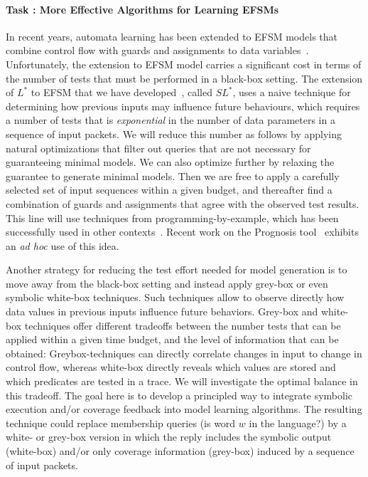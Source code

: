 \documentclass[11pt]{article}
\newcommand{\system}[1]{\mbox{\textsf{#1}}}
\newcounter{Task}
\newcommand{\task}[1]{\addtocounter{Task}{1}\paragraph{Task \theTask: #1}}
\newcommand{\myparagraph}{}
\let\myparagraph=\paragraph
\renewcommand{\paragraph}{\vspace{-3mm}\myparagraph}
\begin{document}
\task{More Effective Algorithms for Learning EFSMs}
In recent years, automata learning has been extended to EFSM models that
combine control flow with guards and assignments to data
variables~\cite{CasselHJS16,AJUV15}.
Unfortunately, the extension to EFSM model carries a significant cost in terms
of the number of tests that must be performed in a black-box setting.
The extension of $L^*$ to EFSM that we have developed~\cite{CasselHJS16}, called $SL^*$, uses a naive technique 
for determining how previous inputs may influence future behaviours, which
requires a number of tests that is \emph{exponential} in the number of data parameters in a
sequence of input packets.
We will reduce this number as follows by applying natural optimizations that
 filter out queries that are not necessary for guaranteeing minimal models.
 We can also optimize further    by relaxing the guarantee to generate minimal models.
Then we are free to apply a carefully selected set of input sequences within a given budget, and thereafter find a combination of guards and assignments that agree with the observed test results. This line will use techniques from programming-by-example, which has been successfully used in other contexts~\cite{GulwaniPS17}. Recent work on the Prognosis tool~\cite{Prognosis@SIGCOMM-21} exhibits an \emph{ad hoc} use of this idea.

Another strategy for reducing the test effort needed for model generation is to move away from
the black-box setting and instead apply grey-box or even symbolic white-box techniques. Such techniques allow to
observe directly how data values in previous inputs influence future behaviors. Grey-box and white-box techniques offer
different tradeoffs between the number tests that can be applied within a given time budget, and the level of information that
can be obtained: Greybox-techniques can directly correlate changes in input to change in control flow, whereas white-box
directly reveals which values are stored and which predicates are tested in a trace.
We will investigate the optimal balance in this tradeoff.
The goal here is to develop a principled way to integrate symbolic execution and/or coverage feedback into model learning algorithms.
The resulting technique could replace membership queries (is word $w$ in the language?) by a white- or grey-box
version in which the reply includes the symbolic output (white-box) and/or only coverage information (grey-box) induced by a
sequence of input packets.
\end{document}
